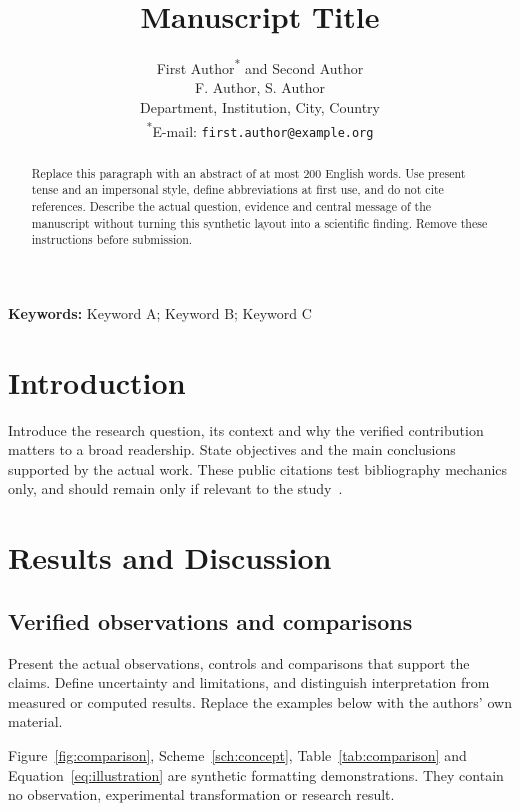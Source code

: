 \documentclass[a4paper,11pt]{article}
\title{Manuscript Title}
\author{First Author\textsuperscript{*} and Second Author\\
  \small F. Author, S. Author\\
  \small Department, Institution, City, Country\\
  \small \textsuperscript{*}E-mail: \texttt{first.author@example.org}}
\date{}
\begin{document}
\maketitle
\noindent\textbf{Keywords:} Keyword A; Keyword B; Keyword C

\begin{abstract}
Replace this paragraph with an abstract of at most 200 English words. Use
present tense and an impersonal style, define abbreviations at first use,
and do not cite references. Describe the actual question, evidence and
central message of the manuscript without turning this synthetic layout
into a scientific finding. Remove these instructions before submission.
\end{abstract}

\section{Introduction}\label{sec:introduction}
Introduce the research question, its context and why the verified
contribution matters to a broad readership. State objectives and the main
conclusions supported by the actual work. These public citations test
bibliography mechanics only, and should remain only if relevant to the
study~\cite{wilkinson2016fair,peng2011reproducible}.

\section{Results and Discussion}\label{sec:results}
\subsection{Verified observations and comparisons}
Present the actual observations, controls and comparisons that support the
claims. Define uncertainty and limitations, and distinguish interpretation
from measured or computed results. Replace the examples below with the
authors' own material.

Figure~\ref{fig:comparison}, Scheme~\ref{sch:concept}, Table~\ref{tab:comparison}
and Equation~\eqref{eq:illustration} are synthetic formatting demonstrations.
They contain no observation, experimental transformation or research result.
\end{document}
